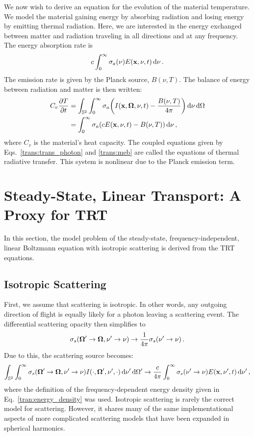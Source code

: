 \documentclass[../doc.tex]{subfiles}
\begin{document}
We now wish to derive an equation for the evolution of the material temperature. We model the material gaining energy by absorbing radiation and losing energy by emitting thermal radiation. Here, we are interested in the energy exchanged between matter and radiation traveling in all directions and at any frequency. 
The energy absorption rate is 
	\begin{equation}
		c\int_0^\infty \sigma_a(\nu) E(\boldsymbol{\mathrm{x}},\nu,t) \mathop{}\!\mathrm{d} \nu \,. 
	\end{equation}
The emission rate is given by the Planck source, $B(\nu,T)$.
The balance of energy between radiation and matter is then written: 
	\begin{equation} \label{trans:meb}
	\begin{aligned}
		C_v \frac{\partial T}{\partial t} &= \int_{\mathbb{S}^2} \int_0^\infty \sigma_a\!\left( I(\boldsymbol{\mathrm{x}},\boldsymbol{\Omega},\nu,t) - \frac{B(\nu,T)}{4\pi} \right) \mathop{}\!\mathrm{d} \nu \mathop{}\!\mathrm{d} \Omega \\
		&= \int_0^\infty \sigma_a (c E(\boldsymbol{\mathrm{x}},\nu,t) - B(\nu,T)) \mathop{}\!\mathrm{d} \nu \,, 
	\end{aligned}
	\end{equation}
where $C_v$ is the material's heat capacity. The coupled equations given by Eqs.~\ref{trans:trans_photon} and \ref{trans:meb} are called the equations of thermal radiative transfer. This system is nonlinear due to the Planck emission term. 

\section{Steady-State, Linear Transport: A Proxy for TRT}
In this section, the model problem of the steady-state, frequency-independent, linear Boltzmann equation with isotropic scattering is derived from the TRT equations. 

\subsection{Isotropic Scattering}
First, we assume that scattering is isotropic. In other words, any outgoing direction of flight is equally likely for a photon leaving a scattering event. The differential scattering opacity then simplifies to 
	\begin{equation}
		\sigma_s(\boldsymbol{\Omega}'\rightarrow\boldsymbol{\Omega},\nu'\rightarrow\nu) \rightarrow \frac{1}{4\pi}\sigma_s(\nu'\rightarrow \nu) \,. 
	\end{equation}
Due to this, the scattering source becomes: 
	\begin{equation}
		\int_{\mathbb{S}^2} \int_0^\infty \sigma_s(\boldsymbol{\Omega}'\rightarrow\boldsymbol{\Omega},\nu'\rightarrow \nu) I(\cdot,\boldsymbol{\Omega}',\nu',\cdot) \mathop{}\!\mathrm{d} \nu'\mathop{}\!\mathrm{d}\Omega' \rightarrow \frac{c}{4\pi} \int_0^\infty \sigma_s(\nu'\rightarrow\nu) E(\boldsymbol{\mathrm{x}},\nu',t) \mathop{}\!\mathrm{d} \nu' \,, 
	\end{equation}
where the definition of the frequency-dependent energy density given in Eq.~\ref{tran:energy_density} was used. Isotropic scattering is rarely the correct model for scattering. However, it shares many of the same implementational aspects of more complicated scattering models that have been expanded in spherical harmonics. 
\end{document}
